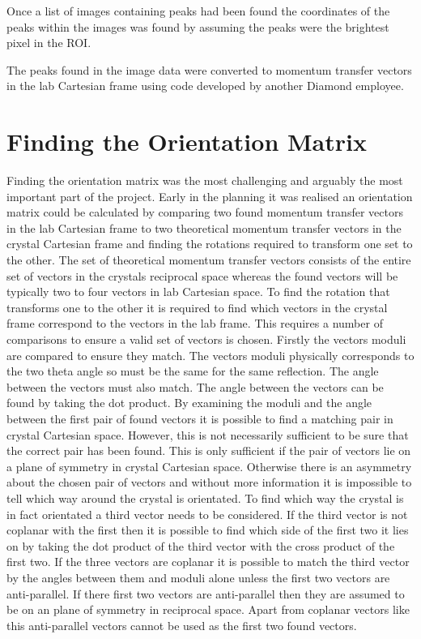 \documentclass[10pt,a4paper]{article}
\begin{document}
\begin{multicols}{2}
Once a list of images containing peaks had been found the coordinates of the peaks within the images was found by assuming the peaks were the brightest pixel in the ROI.

The peaks found in the image data were converted to momentum transfer vectors in the lab Cartesian frame using code developed by another Diamond employee.

\section*{Finding the Orientation Matrix}
Finding the orientation matrix was the most challenging and arguably the most important part of the project. Early in the planning it was realised an orientation matrix could be calculated by comparing two found momentum transfer vectors in the lab Cartesian frame to two theoretical momentum transfer vectors in the crystal Cartesian frame and finding the rotations required to transform one set to the other. The set of theoretical momentum transfer vectors consists of the entire set of vectors in the crystals reciprocal space %
whereas the found vectors will be typically two to four vectors in lab Cartesian space. To find the rotation that transforms one to the other it is required to find which vectors in the crystal frame correspond to the vectors in the lab frame. This requires a number of comparisons to ensure a valid set of vectors is chosen. Firstly the vectors moduli are compared to ensure they match. The vectors moduli physically corresponds to the two theta angle so must be the same for the same reflection. The angle between the vectors must also match. The angle between the vectors can be found by taking the dot product. By examining the moduli and the angle between the first pair of found vectors it is possible to find a matching pair in crystal Cartesian space. However, this is not necessarily sufficient to be sure that the correct pair has been found. This is only sufficient if the pair of vectors lie on a plane of symmetry in crystal Cartesian space. Otherwise there is an asymmetry about the chosen pair of vectors and without more information it is impossible to tell which way around the crystal is orientated. %
To find which way the crystal is in fact orientated a third vector needs to be considered. If the third vector is not coplanar with the first then it is possible to find which side of the first two it lies on by taking the dot product of the third vector with the cross product of the first two. If the three vectors are coplanar it is possible to match the third vector by the angles between them and moduli alone unless the first two vectors are anti-parallel. If there first two vectors are anti-parallel then they are assumed to be on an plane of symmetry in reciprocal space. Apart from coplanar vectors like this anti-parallel vectors cannot be used as the first two found vectors.


\end{multicols}
\end{document}
